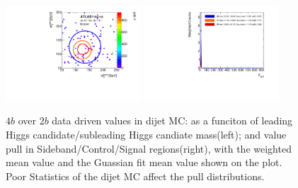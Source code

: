 \begin{figure}[htbp!]
\begin{center}
\includegraphics[width=0.45\textwidth,angle=-90]{figures/boosted/AppendixMuqcdstudy/QCD_FourTag_Incl_mH0H1.pdf}
\includegraphics[width=0.45\textwidth,angle=-90]{figures/boosted/AppendixMuqcdstudy/QCD_FourTag_Incl_mH0H1_pull.pdf}
\caption{$4b$ over $2b$ data driven \muqcd values in dijet MC: \muqcd as a funciton of leading Higgs candidate/subleading Higgs candiate mass(left); and \muqcd value pull in Sideband/Control/Signal regions(right), with the weighted mean value and the Guassian fit mean value shown on the plot. Poor Statistics of the dijet MC affect the pull distributions.}
\label{fig:app-muqcd-4b-qcd}
\end{center}
\end{figure}